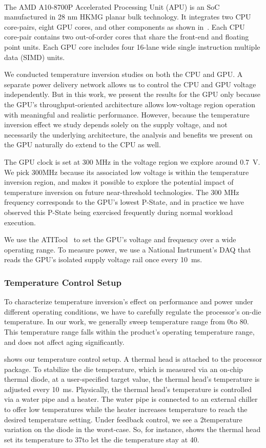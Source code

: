 The AMD\textsuperscript{\textregistered} A10-8700P Accelerated Processing Unit (APU) is an SoC manufactured in 28 nm HKMG planar bulk technology. It integrates two CPU core-pairs, eight GPU cores, and other components as shown in~. Each CPU core-pair contains two out-of-order cores that share the front-end and floating point units. Each GPU core includes four 16-lane wide single instruction multiple data (SIMD) units. 

We conducted temperature inversion studies on both the CPU and GPU. A separate power delivery network allows us to control the CPU and GPU voltage independently. But in this work, we present the results for the GPU only because the GPU's throughput-oriented architecture allows low-voltage region operation with meaningful and realistic performance. However, because the temperature inversion effect we study depends solely on the supply voltage, and not necessarily the underlying architecture, the analysis and benefits we present on the GPU naturally do extend to the CPU as well.

The GPU clock is set at 300 MHz in the voltage region we explore around 0.7~V. We pick 300MHz because its associated low voltage is within the temperature inversion region, and makes it possible to explore the potential impact of temperature inversion on future near-threshold technologies. The 300 MHz frequency corresponds to the GPU's lowest P-State, and in practice we have observed this P-State being exercised frequently during normal workload execution. 

We use the ATITool~\cite{atitool} to set the GPU's voltage and frequency over a wide operating range. To measure power, we use a National Instrument's DAQ that reads the GPU's isolated supply voltage rail once every 10~ms.

\subsubsection{Temperature Control Setup}
\label{sec:temperature:setup:temp}

To characterize temperature inversion's effect on performance and power under different operating conditions, we have to carefully regulate the processor's on-die temperature. In our work, we generally sweep temperature range from 0\C to 80\C. This temperature range falls within the product's operating temperature range, and does not affect aging significantly.

 shows our temperature control setup. A thermal head is attached to the processor package. To stabilize the die temperature, which is measured via an on-chip thermal diode, at a user-specified target value, the thermal head's temperature is adjusted every 10~ms. Physically, the thermal head's temperature is controlled via a water pipe and a heater. The water pipe is connected to an external chiller to offer low temperatures while the heater increases temperature to reach the desired temperature setting. Under feedback control, we see a 2\C temperature variation on the diode in the worst-case. So, for instance,  shows the thermal head set its temperature to 37\C to let the die temperature stay at 40\C. 

